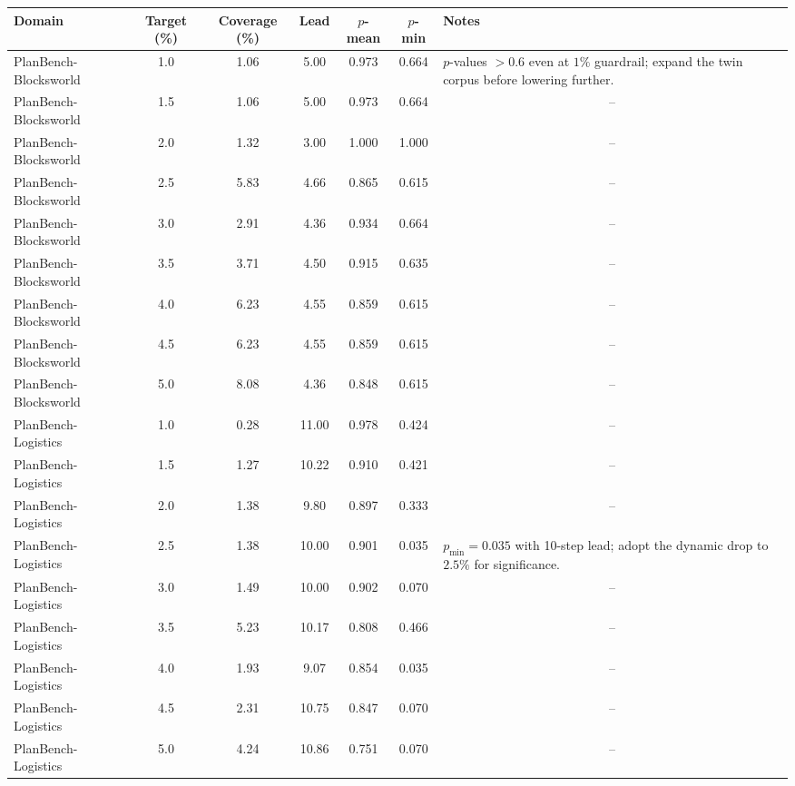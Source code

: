 {\scriptsize
\setlength{\tabcolsep}{4pt}
\begin{tabularx}{\textwidth}{lcccccY}
\toprule
Domain & Target (\%) & Coverage (\%) & Lead & $p$-mean & $p$-min & Notes\\
\midrule
PlanBench-Blocksworld & 1.0 & 1.06 & 5.00 & 0.973 & 0.664 & $p$-values $>0.6$ even at $1\%$ guardrail; expand the twin corpus before lowering further.\\
PlanBench-Blocksworld & 1.5 & 1.06 & 5.00 & 0.973 & 0.664 & \\
PlanBench-Blocksworld & 2.0 & 1.32 & 3.00 & 1.000 & 1.000 & \\
PlanBench-Blocksworld & 2.5 & 5.83 & 4.66 & 0.865 & 0.615 & \\
PlanBench-Blocksworld & 3.0 & 2.91 & 4.36 & 0.934 & 0.664 & \\
PlanBench-Blocksworld & 3.5 & 3.71 & 4.50 & 0.915 & 0.635 & \\
PlanBench-Blocksworld & 4.0 & 6.23 & 4.55 & 0.859 & 0.615 & \\
PlanBench-Blocksworld & 4.5 & 6.23 & 4.55 & 0.859 & 0.615 & \\
PlanBench-Blocksworld & 5.0 & 8.08 & 4.36 & 0.848 & 0.615 & \\
PlanBench-Logistics & 1.0 & 0.28 & 11.00 & 0.978 & 0.424 & \\
PlanBench-Logistics & 1.5 & 1.27 & 10.22 & 0.910 & 0.421 & \\
PlanBench-Logistics & 2.0 & 1.38 & 9.80 & 0.897 & 0.333 & \\
PlanBench-Logistics & 2.5 & 1.38 & 10.00 & 0.901 & 0.035 & $p_{\min}=0.035$ with 10-step lead; adopt the dynamic drop to $2.5\%$ for significance.\\
PlanBench-Logistics & 3.0 & 1.49 & 10.00 & 0.902 & 0.070 & \\
PlanBench-Logistics & 3.5 & 5.23 & 10.17 & 0.808 & 0.466 & \\
PlanBench-Logistics & 4.0 & 1.93 & 9.07 & 0.854 & 0.035 & \\
PlanBench-Logistics & 4.5 & 2.31 & 10.75 & 0.847 & 0.070 & \\
PlanBench-Logistics & 5.0 & 4.24 & 10.86 & 0.751 & 0.070 & \\

\end{tabularx}}
